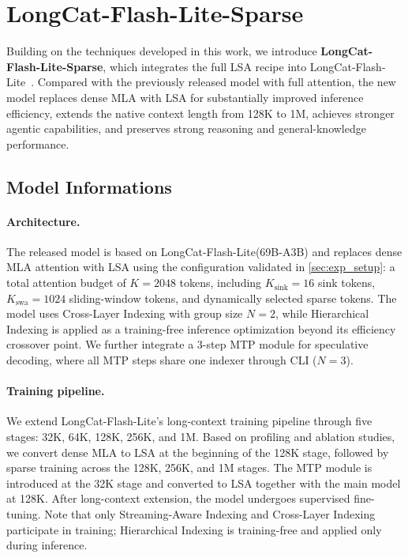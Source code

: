 \documentclass{article}
\newcommand{\longcat}{LongCat-Flash-Lite\xspace}
\newcommand{\kmax}{K}
\begin{document}
\section{LongCat-Flash-Lite-Sparse}
\label{sec:release_model}
Building on the techniques developed in this work, we introduce \textbf{LongCat-Flash-Lite-Sparse}, which integrates the full LSA recipe into \longcat~\citep{liu2026scaling}. Compared with the previously released model with full attention, the new model replaces dense MLA with LSA for substantially improved inference efficiency, extends the native context length from 128K to 1M, achieves stronger agentic capabilities, and preserves strong reasoning and general-knowledge performance.


\subsection{Model Informations}
\label{sec:release_info}

\paragraph{Architecture.}
The released model is based on \longcat (69B-A3B) and replaces dense MLA attention with LSA using the configuration validated in \cref{sec:exp_setup}: a total attention budget of \(\kmax=2048\) tokens, including \(K_{\text{sink}}=16\) sink tokens, \(K_{\text{swa}}=1024\) sliding-window tokens, and dynamically selected sparse tokens. The model uses Cross-Layer Indexing with group size \(N=2\), while Hierarchical Indexing is applied as a training-free inference optimization beyond its efficiency crossover point. We further integrate a 3-step MTP module for speculative decoding, where all MTP steps share one indexer through CLI (\(N=3\)).


\paragraph{Training pipeline.}
We extend \longcat's long-context training pipeline through five stages: 32K, 64K, 128K, 256K, and 1M. Based on profiling and ablation studies, we convert dense MLA to LSA at the beginning of the 128K stage, followed by sparse training across the 128K, 256K, and 1M stages. The MTP module is introduced at the 32K stage and converted to LSA together with the main model at 128K. After long-context extension, the model undergoes supervised fine-tuning. Note that only Streaming-Aware Indexing and Cross-Layer Indexing participate in training; Hierarchical Indexing is training-free and applied only during inference.
\end{document}
